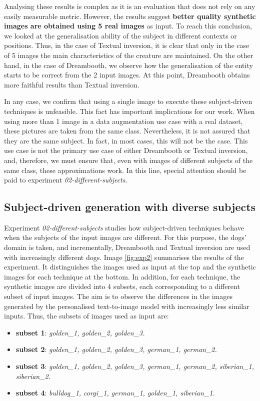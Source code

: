 Analysing these results is complex as it is an evaluation that does not rely on any easily measurable metric. However, the results suggest \textbf{better quality synthetic images are obtained using 5 real images} as input. To reach this conclusion, we looked at the generalisation ability of the subject in different contexts or positions. Thus, in the case of Textual inversion, it is clear that only in the case of 5 images the main characteristics of the creature are maintained. On the other hand, in the case of Dreambooth, we observe how the generalisation of the entity starts to be correct from the 2 input images. At this point, Dreambooth obtains more faithful results than Textual inversion.

In any case, we confirm that using a single image to execute these subject-driven techniques is unfeasible. This fact has important implications for our work. When using more than 1 image in a data augmentation use case with a real dataset, these pictures are taken from the same class. Nevertheless, it is not assured that they are the same subject. In fact, in most cases, this will not be the case. This use case is not the primary use case of either Dreambooth or Textual inversion, and, therefore, we must ensure that, even with images of different subjects of the same class, these approximations work. In this line, special attention should be paid to experiment \textit{02-different-subjects}.

\subsection{Subject-driven generation with diverse subjects} \label{sec: exp-02}

Experiment \textit{02-different-subjects} studies how subject-driven techniques behave when the subjects of the input images are different. For this purpose, the dogs' domain is taken, and incrementally, Dreambooth and Textual inversion are used with increasingly different dogs. Image \ref{fig:exp2} summarises the results of the experiment. It distinguishes the images used as input at the top and the synthetic images for each technique at the bottom. In addition, for each technique, the synthetic images are divided into 4 subsets, each corresponding to a different subset of input images. The aim is to observe the differences in the images generated by the personalised text-to-image model with increasingly less similar inputs. Thus, the subsets of images used as input are:

\begin{itemize}
    \item \textbf{subset 1}: \textit{golden\_1, golden\_2, golden\_3.}
    \item \textbf{subset 2}: \textit{golden\_1, golden\_2, golden\_3, german\_1, german\_2.}
    \item \textbf{subset 3}: \textit{golden\_1, golden\_2, golden\_3, german\_1, german\_2, siberian\_1, siberian\_2.}
    \item \textbf{subset 4}: \textit{bulldog\_1, corgi\_1, german\_1, golden\_1, siberian\_1.}
\end{itemize}

